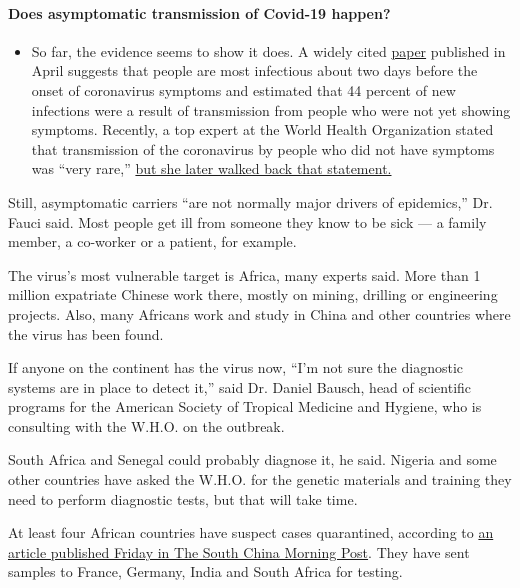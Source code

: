 \begin{itemize}
{  \paragraph{Does asymptomatic transmission of Covid-19
  happen?}\label{does-asymptomatic-transmission-of-covid-19-happen}}

  \begin{itemize}
  \tightlist
  \item
    So far, the evidence seems to show it does. A widely cited
    \href{https://www.nature.com/articles/s41591-020-0869-5}{paper}
    published in April suggests that people are most infectious about
    two days before the onset of coronavirus symptoms and estimated that
    44 percent of new infections were a result of transmission from
    people who were not yet showing symptoms. Recently, a top expert at
    the World Health Organization stated that transmission of the
    coronavirus by people who did not have symptoms was ``very rare,''
    \href{https://www.nytimes.com/2020/06/09/world/coronavirus-updates.html?action=click\&pgtype=Article\&state=default\&region=MAIN_CONTENT_3\&context=storylines_faq\#link-1f302e21}{but
    she later walked back that statement.}
  \end{itemize}
\end{itemize}

Still, asymptomatic carriers ``are not normally major drivers of
epidemics,'' Dr. Fauci said. Most people get ill from someone they know
to be sick --- a family member, a co-worker or a patient, for example.

The virus's most vulnerable target is Africa, many experts said. More
than 1 million expatriate Chinese work there, mostly on mining, drilling
or engineering projects. Also, many Africans work and study in China and
other countries where the virus has been found.

If anyone on the continent has the virus now, ``I'm not sure the
diagnostic systems are in place to detect it,'' said Dr. Daniel Bausch,
head of scientific programs for the American Society of Tropical
Medicine and Hygiene, who is consulting with the W.H.O. on the outbreak.

South Africa and Senegal could probably diagnose it, he said. Nigeria
and some other countries have asked the W.H.O. for the genetic materials
and training they need to perform diagnostic tests, but that will take
time.

At least four African countries have suspect cases quarantined,
according to
\href{https://www.scmp.com/news/china/article/3048310/china-coronavirus-african-nations-quarantine-symptomatic-passengers}{an
article published Friday in The South China Morning Post}. They have
sent samples to France, Germany, India and South Africa for testing.

